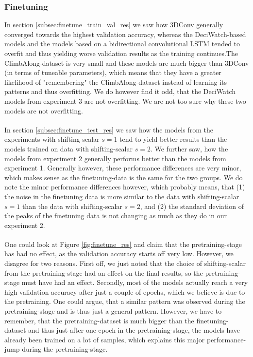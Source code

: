 \documentclass[./main.tex]{subfiles}
\begin{document}
\subsubsection{Finetuning}
In section \ref{subsec:finetune_train_val_res} we saw how 3DConv generally converged towards the highest validation accuracy, whereas the DeciWatch-based models and the models based on a bidirectional convolutional LSTM tended to overfit and thus yielding worse validation results as the training continues.The ClimbAlong-dataset is very small and these models are much bigger than 3DConv (in terms of tuneable parameters), which means that they have a greater likelihood of "remembering" the ClimbAlong-dataset instead of learning its patterns and thus overfitting. We do however find it odd, that the DeciWatch models from experiment 3 are not overfitting. We are not too sure why these two models are not overfitting.
\\
\\
In section \ref{subsec:finetune_test_res} we saw how the models from the experiments with shifting-scalar $s = 1$ tend to yield better results than the models trained on data with shifting-scalar $s = 2$. We further saw, how the models from experiment 2 generally performs better than the models from experiment 1. Generally however, these performance differences are very minor, which makes sense as the finetuning-data is the same for the two groups. We do note the minor performance differences however, which probably means, that (1) the noise in the finetuning data is more similar to the data with shifting-scalar $s = 1$ than the data with shifting-scalar $s = 2$, and (2) the standard deviation of the peaks of the finetuning data is not changing as much as they do in our experiment 2. 
\\
\\
One could look at Figure \ref{fig:finetune_res} and claim that the pretraining-stage has had no effect, as the validation accuracy starts off very low. However, we disagree for two reasons. First off, we just noted that the choice of shifting-scalar from the pretraining-stage had an effect on the final results, so the pretraining-stage must have had an effect. Secondly, most of the models actually reach a very high validation accuracy after just a couple of epochs, which we believe is due to the pretraining. One could argue, that a similar pattern was observed during the pretraining-stage and is thus just a general pattern. However, we have to remember, that the pretraining-dataset is much bigger than the finetuning-dataset and thus just after one epoch in the pretraining-stage, the models have already been trained on a lot of samples, which explains this major performance-jump during the pretraining-stage.
\end{document}
